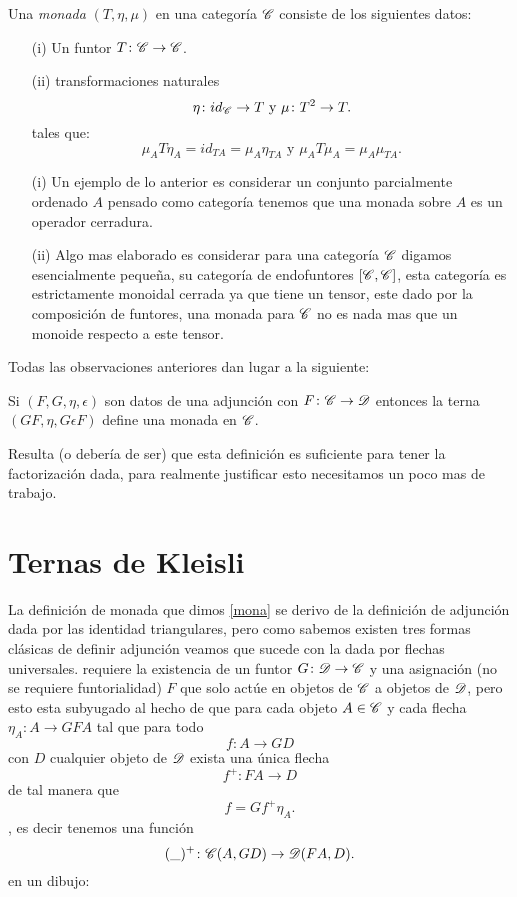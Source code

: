 \documentclass{comunicaciones}
\begin{document}
\begin{dfn}\label{mona}
Una \emph{monada} $(T, \eta, \mu)$ en una categoría $\C$ consiste de los siguientes datos:\begin{itemize}
\item[(i)] Un funtor $T\colon \C\rightarrow\C$.
\item[(ii)] transformaciones naturales \[\eta\colon id_{\C}\rightarrow T\text{ y } \mu\colon T^{2}\rightarrow T.\] tales que:\[\mu_{A} T\eta_{A}=id_{TA}=\mu_{A}\eta_{TA}\text{ y } \mu_{A}T\mu_{A}=\mu_{A}\mu_{TA}.\]  
\end{itemize}


\end{dfn}
\begin{itemize}


\item[(i)]   Un ejemplo de lo anterior es considerar un conjunto parcialmente ordenado $A$ pensado como categoría tenemos que una monada sobre $A$ es un operador cerradura.
\item[(ii)] Algo mas elaborado es considerar para una categoría $\C$ digamos esencialmente pequeña, su categoría de endofuntores $[\C,\C]$, esta categoría es estrictamente monoidal cerrada ya que tiene un tensor, este
 dado por la composición de funtores, una monada para $\C$ no es nada mas que un monoide respecto a este tensor.  

\end{itemize}

Todas las observaciones anteriores dan lugar a la siguiente:

\begin{prop}\label{adjmon}
Si $(F,G,\eta,\epsilon)$ son datos de una adjunción con $F\colon \C\rightarrow\D$ entonces la terna $(GF, \eta,G\epsilon F)$ define una monada en $\EuScript{C}$.
\end{prop}   

Resulta (o debería de ser) que esta definición es suficiente para tener la factorización dada, para realmente justificar esto necesitamos un poco mas de trabajo.

\section{Ternas de Kleisli}\label{KLEI}

La definición de monada que dimos \ref{mona} se derivo de la definición de adjunción dada por las identidad triangulares, pero como sabemos existen tres formas clásicas de definir adjunción veamos que sucede con la dada por flechas universales.
requiere la existencia de un funtor $G\colon\D\rightarrow \C$ y una asignación (no se requiere funtorialidad) $F$ que solo actúe en objetos de $\C$ a objetos de $\D$, pero esto esta subyugado al hecho de que para cada objeto $A\in\C$ y cada flecha
$\eta_{A}\colon A\rightarrow GFA$ tal que para todo \[f\colon A\rightarrow GD\] con $D$ cualquier objeto de $\D$ exista una única flecha \[f^{+}\colon FA\rightarrow D\] de tal manera que \[f=Gf^{+}\eta_{A}.\], es decir tenemos
una función \[(\_)^{+}\colon\C(A,GD)\rightarrow\D(FA,D).\] en un dibujo:
\end{document}
